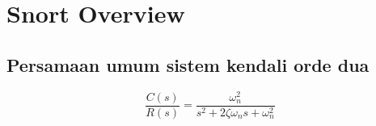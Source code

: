 \documentclass{book}
\begin{document}
\chapter{Snort Overview}
\section{Persamaan umum sistem kendali orde dua}
\begin{equation}
    \frac{C(s)}{R(s)} = \frac{\omega_{n}^{2}}{s^2+2\zeta\omega_n s+\omega_{n}^{2}}
\end{equation}
\end{document}
